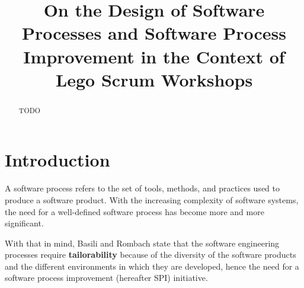 \documentclass[conference]{IEEEtran}
\begin{document}
\title{On the Design of Software Processes and Software Process Improvement in
the Context of Lego Scrum Workshops}

\author{
}

\maketitle

\begin{abstract}

TODO
\end{abstract}

\section{Introduction}


A software process refers to the set of tools, methods, and practices used to
produce a software product. \cite{Humphrey1989}  
With the increasing complexity of software systems, the need for a well-defined
software process has become more and more significant.

With that in mind, Basili and Rombach \cite{Basili1988} state that the software
engineering processes require \textbf{tailorability} because of the diversity
of the software products and the different environments in which they are
developed, hence the need for a software process improvement (hereafter SPI)
initiative.
\end{document}
